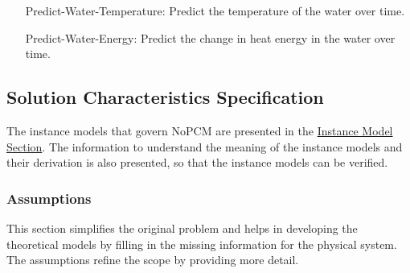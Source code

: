 \documentclass[12pt]{article}
\begin{document}
\begin{itemize}
\item[Predict-Water-Temperature:\phantomsection\label{waterTempGS}]{Predict the temperature of the water over time.}
\item[Predict-Water-Energy:\phantomsection\label{waterEnergyGS}]{Predict the change in heat energy in the water over time.}
\end{itemize}
\subsection{Solution Characteristics Specification}
\label{Sec:SolCharSpec}
The instance models that govern NoPCM are presented in the \hyperref[Sec:IMs]{Instance Model Section}. The information to understand the meaning of the instance models and their derivation is also presented, so that the instance models can be verified.

\subsubsection{Assumptions}
\label{Sec:Assumps}
This section simplifies the original problem and helps in developing the theoretical models by filling in the missing information for the physical system. The assumptions refine the scope by providing more detail.
\end{document}
